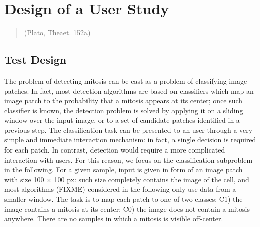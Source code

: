 \chapter{Design of a User Study}
\label{chapter5}
\thispagestyle{empty}

\begin{quotation}
{\footnotesize
{}
\begin{flushright}
(Plato, Theaet. 152a)
\end{flushright}
}
\end{quotation}


\vspace{0.5cm}


\section{Test Design}

The problem of detecting mitosis can be cast as a problem of classifying image
patches. In fact, most detection algorithms are based on classifiers which map
an image patch to the probability that a mitosis appears at its center; once such
classifier is known, the detection problem is solved by applying it on a sliding
window over the input image, or to a set of candidate patches identified in a
previous step.
The classification task can be presented to an user through a very simple and immediate interaction mechanism: in fact, a single decision is required for each
patch. In contrast, detection would require a more complicated interaction with
users. For this reason, we focus on the classification subproblem in the following.
For a given sample, input is given in form of an image patch with size 100 × 100
px: such size completely contains the image of the cell, and most algorithms
(FIXME) considered in the following only use data from a smaller window. The
task is to map each patch to one of two classes: C1) the image contains a mitosis
at its center; C0) the image does not contain a mitosis anywhere. There are no
samples in which a mitosis is visible off-center.


